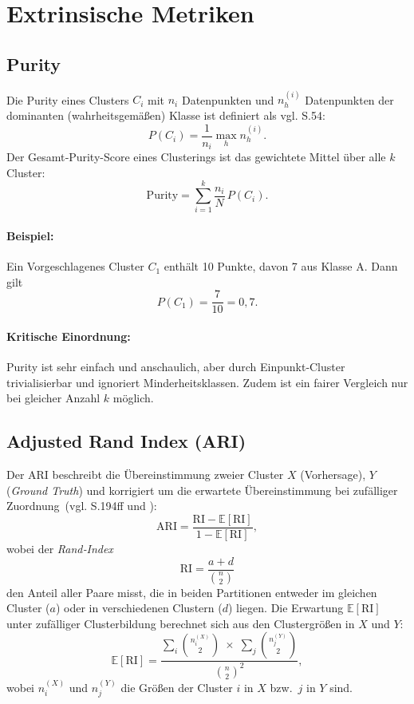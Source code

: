 \section{Extrinsische Metriken}

\subsection{Purity}
Die Purity eines Clusters \(C_i\) mit \(n_i\) Datenpunkten und
\(n_{h}^{(i)}\) Datenpunkten der dominanten (wahrheitsgemäßen) Klasse ist
definiert als {vgl. \cite{huang2008similarity} S.54}:
\[
  P(C_i)=\frac{1}{n_i}\max_h n_{h}^{(i)}.
\]
Der Gesamt‑Purity-Score eines Clusterings ist das gewichtete Mittel über alle \(k\) Cluster:
\[
  \text{Purity} = \sum_{i=1}^k \frac{n_i}{N}\,P(C_i).
\]

\paragraph{Beispiel:}  
Ein Vorgeschlagenes Cluster \(C_1\) enthält 10 Punkte, davon 7 aus Klasse A.
Dann gilt
\[
  P(C_1) = \frac{7}{10} = 0{,}7.
\]

\paragraph{Kritische Einordnung:}  
Purity ist sehr einfach und anschaulich, aber durch Einpunkt‑Cluster trivialisierbar und ignoriert Minderheitsklassen.
Zudem ist ein fairer Vergleich nur bei gleicher Anzahl \(k\) möglich.

\subsection{Adjusted Rand Index (ARI)}
Der \ac{ARI} beschreibt die Übereinstimmung zweier Cluster \(X\) (Vorhersage),
\(Y\) (\emph{Ground Truth}) und korrigiert um die erwartete Übereinstimmung
bei zufälliger Zuordnung (vgl. \cite{Hubert1985} S.194ff und \cite{Miller2024}):
\[
\mathrm{ARI}
= \frac{\mathrm{RI} - \mathbb{E}[\mathrm{RI}]}{1 - \mathbb{E}[\mathrm{RI}]},
\]
wobei der \emph{Rand‐Index}
\[
\mathrm{RI} = \frac{a + d}{\binom{n}{2}}
\]
den Anteil aller Paare misst, die in beiden Partitionen entweder im gleichen Cluster (\(a\)) oder in verschiedenen Clustern (\(d\)) liegen.  
Die Erwartung \(\mathbb{E}[\mathrm{RI}]\) unter zufälliger Clusterbildung berechnet sich aus den Clustergrößen in \(X\) und \(Y\):
\[
\mathbb{E}[\mathrm{RI}]
= \frac{\displaystyle\sum_i \binom{n_i^{(X)}}{2}\;\times\;\sum_j\binom{n_j^{(Y)}}{2}}{\binom{n}{2}^2},
\]
wobei \(n_i^{(X)}\) und \(n_j^{(Y)}\) die Größen der Cluster \(i\) in \(X\) bzw.\ \(j\) in \(Y\) sind.

